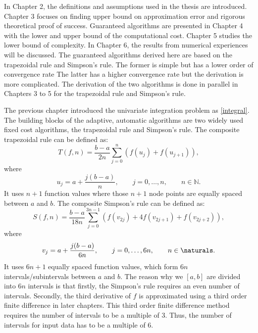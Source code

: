 \documentclass{iitthesis}
\theoremstyle{definition}
\theoremstyle{remark}
\begin{document}

In Chapter 2, the definitions and assumptions used in the thesis are introduced. Chapter 3 focuses on finding upper bound on approximation error and rigorous theoretical proof of success. Guaranteed algorithms are presented in Chapter 4 with the lower and upper bound of the computational cost. Chapter 5 studies the lower bound of complexity. In Chapter 6, the results from numerical experiences will be discussed.  The guaranteed algorithms derived here are based on the trapezoidal rule and Simpson's rule. The former is simple but has a lower order of convergence rate The latter has a higher convergence rate but the derivation is more complicated. The derivation of the two algorithms is done in parallel in Chapters 3 to 5 for the trapezoidal rule and Simpson's rule.

\clearpage





The previous chapter introduced the univariate integration problem as \eqref{integral}. The building blocks of the adaptive, automatic algorithms are two widely used fixed cost algorithms, the trapezoidal rule and Simpson's rule.
The composite trapezoidal rule can be defined as:
\begin{equation}\label{traprule}
  T(f,n)=\frac{b-a}{2n}\sum_{j=0}^{n}(f(u_{j})+f(u_{j+1})),
\end{equation}
where
\begin{equation}\label{upts}
u_j=a+\frac{j(b-a)}{n}, \qquad j=0, \ldots, n, \qquad n\in\mathbb{N}.
\end{equation}
It uses $n+1$ function values where those $n+1$ node points are equally spaced between $a$ and $b$. The composite Simpson's rule can be defined as:
\begin{equation}\label{simrule}
  S(f,n)=\frac{b-a}{18n}\sum_{j=0}^{3n-1}(f(v_{2j})+4f(v_{2j+1})+f(v_{2j+2})),
\end{equation}
where
\begin{equation}\label{vpts}
v_j=a+\frac{j(b-a)}{6n}, \qquad j=0, \ldots, 6n, \qquad n\in \naturals.
\end{equation}
It uses $6n+1$ equally spaced function values, which form $6n$ intervals/subintervals between $a$ and $b$. The reason why we $[a,b]$ are divided into $6n$ intervals is that firstly, the Simpson's rule requires an even number of intervals. Secondly, the third derivative of $f$ is approximated using a third order finite difference in later chapters. This third order finite difference method requires the number of intervals to be a multiple of 3. Thus, the number of intervals for input data has to be a multiple of 6.
\end{document}

